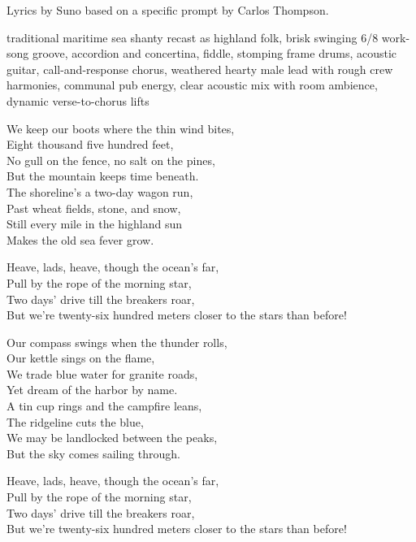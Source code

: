 
\begin{notes}
Lyrics by Suno based on a specific prompt by Carlos Thompson.
\end{notes}
\begin{style}
traditional maritime sea shanty recast as highland folk, brisk swinging 6/8 work-song groove, accordion and concertina, fiddle, stomping frame drums, acoustic guitar, call-and-response chorus, weathered hearty male lead with rough crew harmonies, communal pub energy, clear acoustic mix with room ambience, dynamic verse-to-chorus lifts
\end{style}
\begin{lyrics}
We keep our boots where the thin wind bites,\\
Eight thousand five hundred feet,\\
No gull on the fence, no salt on the pines,\\
But the mountain keeps time beneath.\\
The shoreline's a two-day wagon run,\\
Past wheat fields, stone, and snow,\\
Still every mile in the highland sun\\
Makes the old sea fever grow.

Heave, lads, heave, though the ocean's far,\\
Pull by the rope of the morning star,\\
Two days' drive till the breakers roar,\\
But we're twenty-six hundred meters closer to the stars than before!

Our compass swings when the thunder rolls,\\
Our kettle sings on the flame,\\
We trade blue water for granite roads,\\
Yet dream of the harbor by name.\\
A tin cup rings and the campfire leans,\\
The ridgeline cuts the blue,\\
We may be landlocked between the peaks,\\
But the sky comes sailing through.

Heave, lads, heave, though the ocean's far,\\
Pull by the rope of the morning star,\\
Two days' drive till the breakers roar,\\
But we're twenty-six hundred meters closer to the stars than before!


\end{lyrics}
